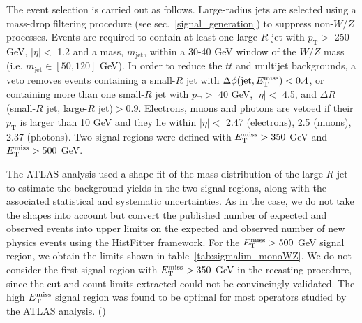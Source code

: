 The \monoWZ event selection is carried out as follows. Large-radius jets are selected using a mass-drop filtering procedure (see sec.~\ref{signal_generation}) to suppress non-$W/Z$ processes. Events are required to contain at least one large-$R$ jet with $p_{\mathrm{T}} >$ 250 GeV, $|\eta| <$ 1.2 and a mass, $m_{\mathrm{jet}}$, within a 30-40 GeV window of the $W/Z$ mass (i.e. $m_{\mathrm{jet}} \in [50, 120]$ GeV). In order to reduce the $t \bar{t}$ and multijet backgrounds, a veto removes events containing a small-$R$ jet with $\Delta\phi(\mathrm{jet},E_{\mathrm{T}}^{\mathrm{miss}})< 0.4$, or containing more than one small-$R$ jet with $p_{\mathrm{T}} >$ 40 GeV, $|\eta| <$ 4.5, and $\Delta R$(small-$R$ jet, large-$R$ jet)$>0.9$. Electrons, muons and photons are vetoed if their $p_{\mathrm{T}}$ is larger than 10 GeV and they lie within $|\eta| <$ 2.47 (electrons), 2.5 (muons), 2.37 (photons). Two signal regions were defined with $E_{\mathrm{T}}^{\mathrm{miss}} > 350$ GeV and $E_{\mathrm{T}}^{\mathrm{miss}} > 500$ GeV.


The ATLAS analysis used a shape-fit of the mass distribution of the large-$R$ jet to estimate the background yields in the two signal regions, along with the associated statistical and systematic uncertainties. As in the \monoZ case, we do not take the shapes into account but convert the published number of expected and observed events into upper limits on the expected and observed number of new physics events using the HistFitter framework. For the $E_{\mathrm{T}}^{\mathrm{miss}} > 500$ GeV signal region, we obtain the limits shown in table~\ref{tab:sigmalim_monoWZ}. We do not consider the first signal region with $E_{\mathrm{T}}^{\mathrm{miss}} > 350$ GeV in the recasting procedure, since the cut-and-count limits extracted could not be convincingly validated. The high $E_{\mathrm{T}}^{\mathrm{miss}}$ signal region was found to be optimal for most operators studied by the ATLAS analysis. ()

